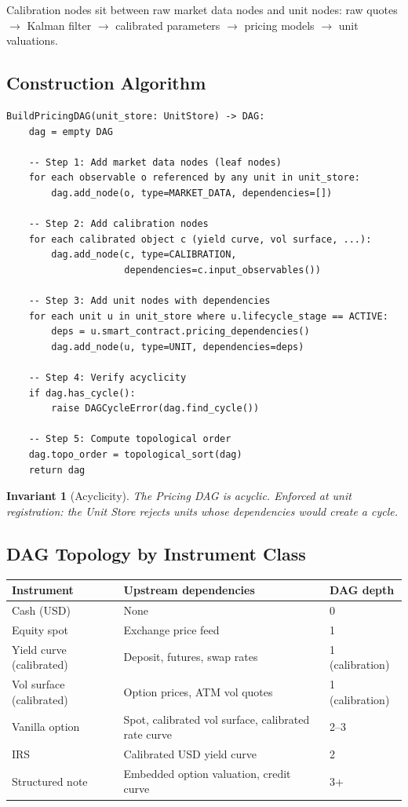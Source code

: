 \documentclass[11pt,a4paper]{article}
\newtheorem{invariant}[definition]{Invariant}
\begin{document}
\noindent Calibration nodes sit between raw market data nodes and unit nodes: raw quotes $\to$ Kalman filter $\to$ calibrated parameters $\to$ pricing models $\to$ unit valuations.

\subsection{Construction Algorithm}

\begin{lstlisting}
BuildPricingDAG(unit_store: UnitStore) -> DAG:
    dag = empty DAG

    -- Step 1: Add market data nodes (leaf nodes)
    for each observable o referenced by any unit in unit_store:
        dag.add_node(o, type=MARKET_DATA, dependencies=[])

    -- Step 2: Add calibration nodes
    for each calibrated object c (yield curve, vol surface, ...):
        dag.add_node(c, type=CALIBRATION,
                     dependencies=c.input_observables())

    -- Step 3: Add unit nodes with dependencies
    for each unit u in unit_store where u.lifecycle_stage == ACTIVE:
        deps = u.smart_contract.pricing_dependencies()
        dag.add_node(u, type=UNIT, dependencies=deps)

    -- Step 4: Verify acyclicity
    if dag.has_cycle():
        raise DAGCycleError(dag.find_cycle())

    -- Step 5: Compute topological order
    dag.topo_order = topological_sort(dag)
    return dag
\end{lstlisting}

\begin{invariant}[Acyclicity]
The Pricing DAG is acyclic.  Enforced at unit registration: the Unit Store rejects units whose dependencies would create a cycle.
\end{invariant}

\subsection{DAG Topology by Instrument Class}

\begin{center}
\small
\begin{tabular}{l l l}
\toprule
\textbf{Instrument} & \textbf{Upstream dependencies} & \textbf{DAG depth} \\
\midrule
Cash (USD) & None & 0 \\
Equity spot & Exchange price feed & 1 \\
Yield curve (calibrated) & Deposit, futures, swap rates & 1 (calibration) \\
Vol surface (calibrated) & Option prices, ATM vol quotes & 1 (calibration) \\
Vanilla option & Spot, calibrated vol surface, calibrated rate curve & 2--3 \\
IRS & Calibrated USD yield curve & 2 \\
Structured note & Embedded option valuation, credit curve & 3+ \\
\bottomrule
\end{tabular}
\end{center}
\end{document}
